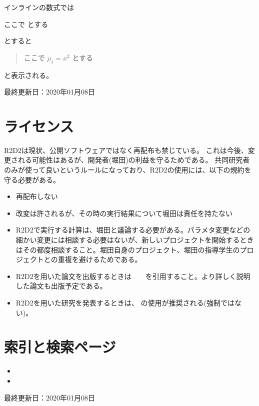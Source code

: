 \documentclass[letterpaper,10pt,dvipdfmx,report]{sphinxmanual}
\begin{document}
インラインの数式では

\begin{sphinxVerbatim}[commandchars=\\\{\}]
ここで  とする
\end{sphinxVerbatim}

とすると
\begin{quote}

ここで \(\rho_1=x^2\) とする
\end{quote}

と表示される。

最終更新日：2020年01月08日


\chapter{ライセンス}
\label{\detokenize{index:id1}}
R2D2は現状、公開ソフトウェアではなく再配布も禁じている。
これは今後、変更される可能性はあるが、開発者(堀田)の利益を守るためである。
共同研究者のみが使って良いというルールになっており、R2D2の使用には、以下の規約を守る必要がある。
\begin{itemize}
\item {} 
再配布しない

\item {} 
改変は許されるが、その時の実行結果について堀田は責任を持たない

\item {} 
R2D2で実行する計算は、堀田と議論する必要がある。パラメタ変更などの細かい変更には相談する必要はないが、新しいプロジェクトを開始するときはその都度相談すること。堀田自身のプロジェクト、堀田の指導学生のプロジェクトとの重複を避けるためである。

\item {} 
R2D2を用いた論文を出版するときは　　を引用すること。より詳しく説明した論文も出版予定である。

\item {} 
R2D2を用いた研究を発表するときは、 の使用が推奨される(強制ではない)。

\end{itemize}


\chapter{索引と検索ページ}
\label{\detokenize{index:id3}}\begin{itemize}
\item {} 

\item {} 

\end{itemize}

最終更新日：2020年01月08日


\renewcommand{\indexname}{Pythonモジュール索引}
\begin{sphinxtheindex}
\let\bigletter\sphinxstyleindexlettergroup
\bigletter{r}
\item\relax{}
\end{sphinxtheindex}

\renewcommand{\indexname}{索引}
\printindex
\end{document}
